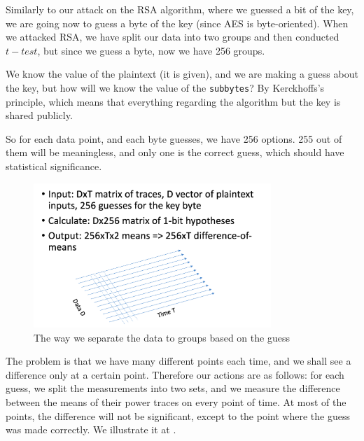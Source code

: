 Similarly to our attack on the RSA algorithm, where we guessed a bit of the key, we are going now to guess a byte of the key (since AES is byte-oriented). 
When we attacked RSA, we have split our data into two groups and then conducted $t-test$, but since we guess a byte, now we have 256 groups.

We know the value of the plaintext (it is given), and we are making a guess about the key, but how will we know the value of the \texttt{subbytes}? 
By Kerckhoffs's principle, which means that everything regarding the algorithm but the key is shared publicly.

So for each data point, and each byte guesses, we have 256 options. 
255 out of them will be meaningless, and only one is the correct guess, which should have statistical significance.

\begin{figure}[!ht]
    \centering
    \includegraphics[width=0.8\textwidth]{images/Lecture6/dpa-separation-figure.png}
    \caption{The way we separate the data to groups based on the guess} \label{fig:dpa-separation-figure}
\end{figure}


The problem is that we have many different points each time, and we shall see a difference only at a certain point. 
Therefore our actions are as follows: for each guess, we split the measurements into two sets, and we measure the difference between the means of their power traces on every point of time. 
At most of the points, the difference will not be significant, except to the point where the guess was made correctly. 
We illustrate it at .

